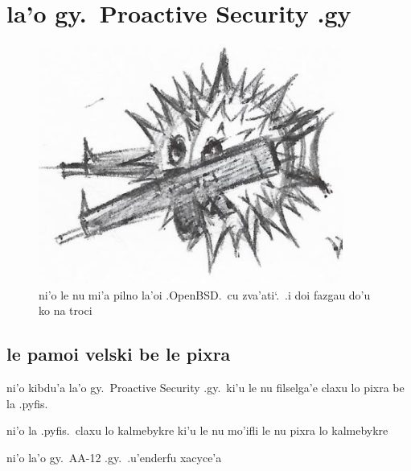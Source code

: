 \documentclass{report}
\newcommand\sds{\spacefactor\sfcode`.\ \space}
\begin{document}
\chapter{la'o gy.\ Proactive Security .gy}
\begin{figure}[ht]
	\centering
	\includegraphics[width=10cm]{proactivesecurity/proactivesecurity.png}
	\caption[center]{ni'o le nu mi'a pilno la'oi .OpenBSD.\ cu zva'ati\sds  .i doi fazgau do'u ko na troci}
\end{figure}
\section{le pamoi velski be le pixra}
ni'o kibdu'a la'o gy.\ Proactive Security .gy.\ ki'u le nu filselga'e claxu lo pixra be la .pyfis.

ni'o la .pyfis.\ claxu lo kalmebykre ki'u le nu mo'ifli le nu pixra lo kalmebykre

ni'o la'o gy.\ AA-12 .gy.\ .u'enderfu xacyce'a
\end{document}
